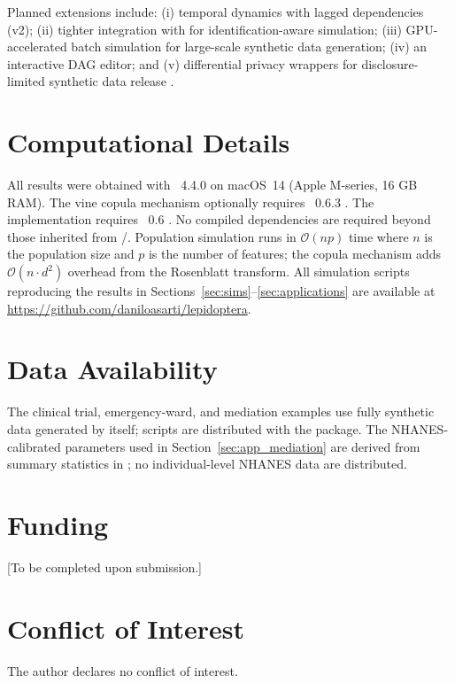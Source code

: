 \documentclass[article]{jss}
\begin{document}
Planned extensions include: (i) temporal dynamics with lagged dependencies (v2);
(ii) tighter integration with  for identification-aware simulation;
(iii) GPU-accelerated batch simulation for large-scale synthetic data generation;
(iv) an interactive DAG editor; and (v) differential privacy wrappers for
disclosure-limited synthetic data release \citep{nowok2016synthpop,
reiter2002satisfying}.

\section{Computational Details}
\label{sec:computational}

All results were obtained with ~4.4.0 \citep{rcore2024} on macOS~14
(Apple M-series, 16 GB RAM). The vine copula mechanism optionally requires
~0.6.3 \citep{nagler2022rvinecopulib}. The 
implementation requires ~0.6 \citep{pyvinecopulib2024}. No
compiled dependencies are required beyond those inherited from
/. Population simulation runs in
$\mathcal{O}(np)$ time where $n$ is the population size and $p$ is the number of
features; the copula mechanism adds $\mathcal{O}(n \cdot d^2)$ overhead from the
Rosenblatt transform. All simulation scripts reproducing the results in
Sections~\ref{sec:sims}--\ref{sec:applications} are available at
\url{https://github.com/daniloasarti/lepidoptera}.

\section*{Data Availability}
The clinical trial, emergency-ward, and mediation examples use fully synthetic data
generated by  itself; scripts are distributed with the package.
The NHANES-calibrated parameters used in Section~\ref{sec:app_mediation} are
derived from summary statistics in \citet{vanderweele2015explanation}; no
individual-level NHANES data are distributed.

\section*{Funding}
[To be completed upon submission.]

\section*{Conflict of Interest}
The author declares no conflict of interest.
\end{document}
